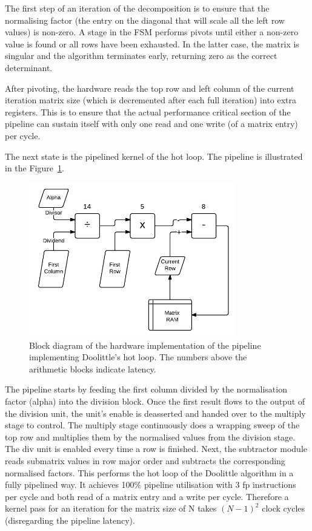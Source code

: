 \documentclass[]{article}
\begin{document}
The first step of an iteration of the decomposition is to ensure that the normalising factor (the entry on the diagonal that will scale all the left row values) is non-zero. A stage in the FSM performs pivots until either a non-zero value is found or all rows have been exhausted. In the latter case, the matrix is singular and the algorithm terminates early, returning zero as the correct determinant.

After pivoting, the hardware reads the top row and left column of the current iteration matrix size (which is decremented after each full iteration) into extra registers. This is to ensure that the actual performance critical section of the pipeline can sustain itself with only one read and one write (of a matrix entry) per cycle.

The next state is the pipelined kernel of the hot loop. The pipeline is illustrated in the Figure~\ref{fig:det_block}.

\begin{figure}[tbp]
	\begin{center}
		\includegraphics[width = 0.8\textwidth]{DeterminantPipeline.pdf}
	\end{center}
	\caption{Block diagram of the hardware implementation of the pipeline implementing Doolittle's hot loop. The numbers above the arithmetic blocks indicate latency.}
	\label{fig:det_block}
\end{figure}

The pipeline starts by feeding the first column divided by the normalisation factor (alpha) into the division block. Once the first result flows to the output of the division unit, the unit’s enable is deasserted and handed over to the multiply stage to control. The multiply stage continuously does a wrapping sweep of the top row and multiplies them by the normalised values from the division stage. The div unit is enabled every time a row is finished. Next, the subtractor module reads submatrix values in row major order and subtracts the corresponding normalised factors. This performs the hot loop of the Doolittle algorithm in a fully pipelined way. It achieves 100\% pipeline utilisation with 3 fp instructions per cycle and both read of a matrix entry and a write per cycle. Therefore a kernel pass for an iteration for the matrix size of N takes $(N-1)^2$ clock cycles (disregarding the pipeline latency).
\end{document}
